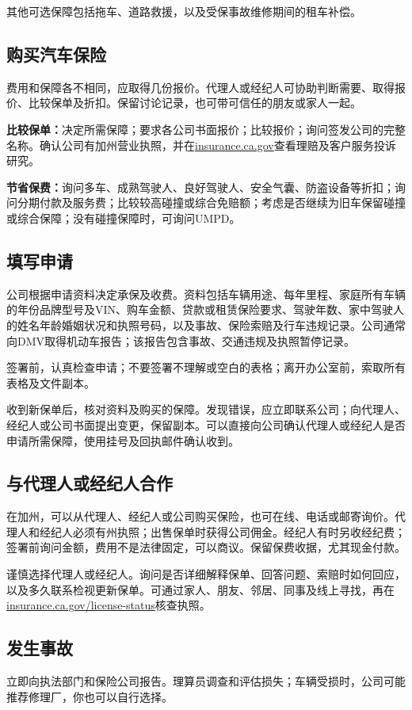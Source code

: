 \documentclass[UTF8,fontset=none,11pt,a4paper]{ctexart}
\begin{document}
其他可选保障包括拖车、道路救援，以及受保事故维修期间的租车补偿。


\subsection*{购买汽车保险}
费用和保障各不相同，应取得几份报价。代理人或经纪人可协助判断需要、取得报价、比较保单及折扣。保留讨论记录，也可带可信任的朋友或家人一起。


\textbf{比较保单：}决定所需保障；要求各公司书面报价；比较报价；询问签发公司的完整名称。确认公司有加州营业执照，并在\url{insurance.ca.gov}查看理赔及客户服务投诉研究。


\textbf{节省保费：}询问多车、成熟驾驶人、良好驾驶人、安全气囊、防盗设备等折扣；询问分期付款及服务费；比较较高碰撞或综合免赔额；考虑是否继续为旧车保留碰撞或综合保障；没有碰撞保障时，可询问UMPD。


\subsection*{填写申请}
公司根据申请资料决定承保及收费。资料包括车辆用途、每年里程、家庭所有车辆的年份品牌型号及VIN、购车金额、贷款或租赁保险要求、驾驶年数、家中驾驶人的姓名年龄婚姻状况和执照号码，以及事故、保险索赔及行车违规记录。公司通常向DMV取得机动车报告；该报告包含事故、交通违规及执照暂停记录。


签署前，认真检查申请；不要签署不理解或空白的表格；离开办公室前，索取所有表格及文件副本。


收到新保单后，核对资料及购买的保障。发现错误，应立即联系公司；向代理人、经纪人或公司书面提出变更，保留副本。可以直接向公司确认代理人或经纪人是否申请所需保障，使用挂号及回执邮件确认收到。


\subsection*{与代理人或经纪人合作}
在加州，可以从代理人、经纪人或公司购买保险，也可在线、电话或邮寄询价。代理人和经纪人必须有州执照；出售保单时获得公司佣金。经纪人有时另收经纪费；签署前询问金额，费用不是法律固定，可以商议。保留保费收据，尤其现金付款。


谨慎选择代理人或经纪人。询问是否详细解释保单、回答问题、索赔时如何回应，以及多久联系检视更新保单。可通过家人、朋友、邻居、同事及线上寻找，再在\url{insurance.ca.gov/license-status}核查执照。


\subsection*{发生事故}
立即向执法部门和保险公司报告。理算员调查和评估损失；车辆受损时，公司可能推荐修理厂，你也可以自行选择。
\end{document}
